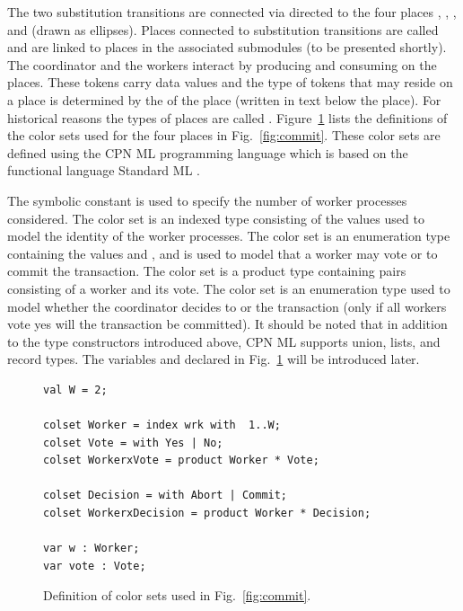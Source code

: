 
The two substitution transitions are connected via directed
 to the four places ,
, , and  (drawn
as ellipses). Places connected to substitution transitions are called
 and are linked to  places in the
associated submodules (to be presented shortly). The coordinator and
the workers interact by producing and consuming  on
the places. These tokens carry data values and the type of tokens that
may reside on a place is determined by the  of the place
(written in text below the place). For historical reasons the types of
places are called . Figure~\ref{fig:coloursets}
lists the definitions of the color sets used for the four places in
Fig.~\ref{fig:commit}. These color sets are defined using the CPN ML
programming language which is based on the functional language
Standard ML \cite{sml}.

The symbolic constant  is used to specify the number of
worker processes considered. The  color set is an
indexed type consisting of the values
 used to model the identity of the
worker processes. The color set  is an enumeration type
containing the values  and , and is used to
model that a worker may vote  or  to commit
the transaction. The color set  is a product type
containing pairs consisting of a worker and its vote. The color set
 is an enumeration type used to model whether the
coordinator decides to  or  the
transaction (only if all workers vote yes will the transaction be
committed). It should be noted that in addition to the type
constructors introduced above, CPN ML supports union, lists, and
record types. The variables  and  declared in
Fig.~\ref{fig:coloursets} will be introduced later.

\begin{figure}[]
\begin{verbatim}
val W = 2;

colset Worker = index wrk with  1..W;
colset Vote = with Yes | No;
colset WorkerxVote = product Worker * Vote;

colset Decision = with Abort | Commit;
colset WorkerxDecision = product Worker * Decision;

var w : Worker;
var vote : Vote;
\end{verbatim}
\caption{Definition of color sets used in Fig.~\ref{fig:commit}.}
\label{fig:coloursets}
\end{figure}


